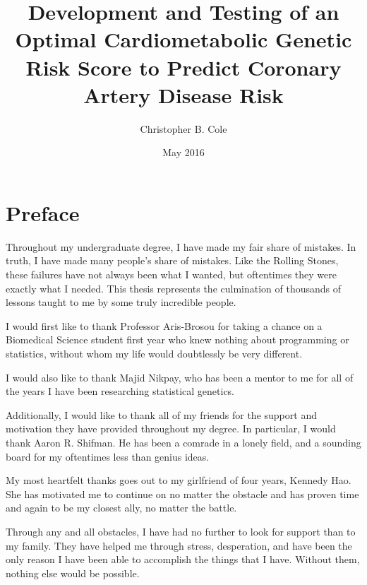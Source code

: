 \documentclass[10pt,a4paper,oneside]{memoir} %
\title{Development and Testing of an Optimal Cardiometabolic Genetic Risk Score to Predict Coronary Artery Disease Risk} %
\author{Christopher B. Cole} %
\date{May 2016} %
\begin{document}
\begin{titlingpage}
\maketitle %
\end{titlingpage}

\frontmatter %





\section*{Preface}

Throughout my undergraduate degree, I have made my fair share of mistakes. In truth, I have made many people's share of mistakes. Like the Rolling Stones, these failures have not always been what I wanted, but oftentimes they were exactly what I needed. This thesis represents the culmination of thousands of lessons taught to me by some truly incredible people.

I would first like to thank Professor Aris-Brosou for taking a chance on a Biomedical Science student first year who knew nothing about programming or statistics, without whom my life would doubtlessly be very different.

I would also like to thank Majid Nikpay, who has been a mentor to me for all of the years I have been researching statistical genetics.

Additionally, I would like to thank all of my friends for the support and motivation they have provided throughout my degree. In particular, I would thank Aaron R. Shifman. He has been a comrade in a lonely field, and a sounding board for my oftentimes less than genius ideas. 

My most heartfelt thanks goes out to my girlfriend of four years, Kennedy Hao. She has motivated me to continue on no matter the obstacle and has proven time and again to be my closest ally, no matter the battle. 

Through any and all obstacles, I have had no further to look for support than to my family. They have helped me through stress, desperation, and have been the only reason I have been able to accomplish the things that I have. Without them, nothing else would be possible.
\end{document}
